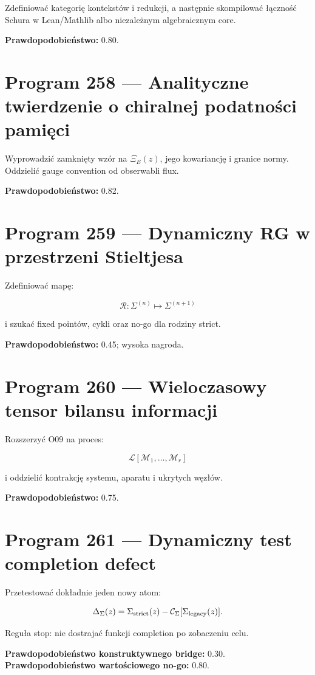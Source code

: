 \documentclass[11pt,a4paper,openany]{report}
\begin{document}
Zdefiniować kategorię kontekstów i redukcji, a następnie skompilować łączność Schura w Lean/\allowbreak{}Mathlib albo niezale\.znym algebraicznym core.

\textbf{Prawdopodobieństwo:} 0.80.

\section{Program 258 --- Analityczne twierdzenie o chiralnej podatności pamięci}

Wyprowadzić zamknięty wzór na \(\Xi_E(z)\), jego kowariancję i granice normy. Oddzielić gauge convention od obserwabli flux.

\textbf{Prawdopodobieństwo:} 0.82.

\section{Program 259 --- Dynamiczny RG w przestrzeni Stieltjesa}

Zdefiniować mapę:

\[
\mathcal R:\Sigma^{(n)}\mapsto\Sigma^{(n+1)}
\]

i szukać fixed pointów, cykli oraz no-go dla rodziny strict.

\textbf{Prawdopodobieństwo:} 0.45; wysoka nagroda.

\section{Program 260 --- Wieloczasowy tensor bilansu informacji}

Rozszerzyć O09 na proces:

\[
\mathcal L[\mathcal M_1,\ldots,\mathcal M_r]
\]

i oddzielić kontrakcję systemu, aparatu i ukrytych węzłów.

\textbf{Prawdopodobieństwo:} 0.75.

\section{Program 261 --- Dynamiczny test completion defect}

Przetestować dokładnie jeden nowy atom:

\[
\Delta_\Sigma(z)
=\Sigma_{\rm strict}(z)
-\mathcal C_\Sigma[\Sigma_{\rm legacy}(z)].
\]

Reguła stop: nie dostrajać funkcji completion po zobaczeniu celu.

\textbf{Prawdopodobieństwo konstruktywnego bridge:} 0.30.\\
\textbf{Prawdopodobieństwo wartościowego no-go:} 0.80.
\end{document}
